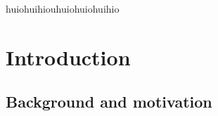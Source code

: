 \uomtoc


\begin{abstract} %
  This is abstract text. 
  
  \lipsum[1-2]
\end{abstract}%
\clearpage



\begin{uomoriginality}
  \uomoriginalitydeclaration 
\end{uomoriginality}
\uomcopyrightstatement



\begin{uomacknowledgements}
huiohuihiouhuiohuiohuihio
\end{uomacknowledgements}



\uomstartmainbody %



\section{Introduction} %
  
  \lipsum[1-5] %

  \subsection{Background and motivation}
  \lipsum[1-2]
  
